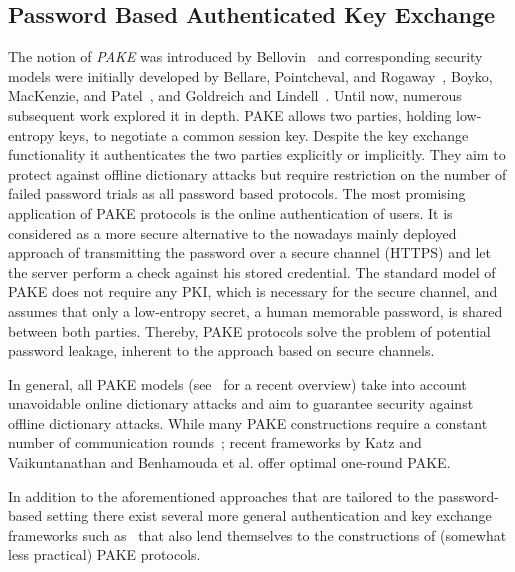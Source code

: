 \subsection{Password Based Authenticated Key Exchange}
The notion of \emph{\ac{PAKE}} was introduced by Bellovin~\cite{bellovin92} and corresponding security models were initially developed by Bellare, Pointcheval, and Rogaway~\cite{Bellare2000}, Boyko, MacKenzie, and Patel~\cite{Boyko2000}, and Goldreich and Lindell~\cite{Goldreich01}.
Until now, numerous subsequent work explored it in depth.
\ac{PAKE} allows two parties, holding low-entropy keys, to negotiate a common session key.
Despite the key exchange functionality it authenticates the two parties explicitly or implicitly.
They aim to protect against offline dictionary attacks but require restriction on the number of failed password trials as all password based protocols.
The most promising application of \ac{PAKE} protocols is the online authentication of users.
It is considered as a more secure alternative to the nowadays mainly deployed approach of transmitting the password over a secure channel (\ac{HTTPS}) and let the server perform a check against his stored credential.
The standard model of \ac{PAKE} does not require any \ac{PKI}, which is necessary for the secure channel, and assumes that only a low-entropy secret, \ie a human memorable password, is shared between both parties.
Thereby, \ac{PAKE} protocols solve the problem of potential password leakage, inherent to the approach based on secure channels.

In general, all PAKE models (see~\cite{Pointcheval2012} for a recent overview) take into account unavoidable online dictionary attacks and aim to guarantee security against offline dictionary attacks.
While many PAKE constructions require a constant number of communication rounds~\cite{Gennaro2003,Abdalla2005,Gennaro2008,Katz2009a,Katz2011}; recent frameworks by Katz and Vaikuntanathan \cite{Katz2011} and Benhamouda et al. \cite{Benhamouda2013} offer optimal one-round PAKE.

In addition to the aforementioned approaches that are tailored to the password-based setting there exist several more general authentication and key exchange frameworks such as~\cite{Camenisch2010,Blazy2012} that also lend themselves to the constructions of (somewhat less practical) PAKE protocols.


